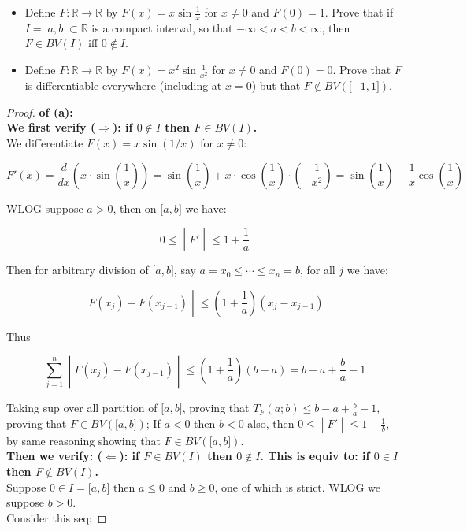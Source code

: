 \documentclass{qlnotes-export}
\begin{document}
\begin{itemize}
\item
  Define \(F:{\mathbb{R}}\rightarrow{\mathbb{R}}\) by \(F(x) = x\sin\frac{1}{x}\) for \(x \neq 0\) and \(F(0) = 1\). Prove that if \(I = \lbrack a,b\rbrack \subset {\mathbb{R}}\) is a compact interval, so that \(- \infty < a < b < \infty\), then \(F \in BV(I)\) iff \(0 \notin I\).
\item
  Define \(F:{\mathbb{R}}\rightarrow{\mathbb{R}}\) by \(F(x) = x^{2}\sin\frac{1}{x^{2}}\) for \(x \neq 0\) and \(F(0) = 0\). Prove that \(F\) is differentiable everywhere (including at \(x = 0\)) but that \(F \notin BV(\lbrack - 1,1\rbrack)\).
\end{itemize}

\begin{proof}

\textbf{of (a):}\\
\textbf{We first verify (\(\Longrightarrow\)): if \(0 \notin I\) then \(F \in BV(I)\).}\\
We differentiate \(F(x) = x\sin(1/x)\) for \(x \neq 0\):

\[F'(x) = \frac{d}{dx}\left( {x \cdot \sin\left( \frac{1}{x} \right)} \right) = \sin\left( \frac{1}{x} \right) + x \cdot \cos\left( \frac{1}{x} \right) \cdot \left( {- \frac{1}{x^{2}}} \right) = \sin\left( \frac{1}{x} \right) - \frac{1}{x}\cos\left( \frac{1}{x} \right)\]

WLOG suppose \(a > 0\), then on \(\lbrack a,b\rbrack\) we have:

\[\left. 0 \leq \middle| F' \middle| \leq 1 + \frac{1}{a} \right.\]

Then for arbitrary division of \(\lbrack a,b\rbrack\), say \(a = x_{0} \leq \cdots \leq x_{n} = b\), for all \(j\) we have:

\[\left. |F(x_{j}) - F(x_{j - 1}) \middle| \leq (1 + \frac{1}{a})(x_{j} - x_{j - 1}) \right.\]

Thus

\[\left. \sum\limits_{j = 1}^{n} \middle| F(x_{j}) - F(x_{j - 1}) \middle| \leq (1 + \frac{1}{a})(b - a) = b - a + \frac{b}{a} - 1 \right.\]

Taking sup over all partition of \(\lbrack a,b\rbrack\), proving that \(T_{F}(a;b) \leq b - a + \frac{b}{a} - 1\), proving that \(F \in BV(\lbrack a,b\rbrack)\); If \(a < 0\) then \(b < 0\) also, then \(\left. 0 \leq \middle| F' \middle| \leq 1 - \frac{1}{b} \right.\), by same reasoning showing that \(F \in BV(\lbrack a,b\rbrack)\).\\
\textbf{Then we verify: (\(\Longleftarrow\)): if \(F \in BV(I)\) then \(0 \notin I\). This is equiv to: if \(0 \in I\) then \(F \notin BV(I)\).}\\
Suppose \(0 \in I = \lbrack a,b\rbrack\) then \(a \leq 0\) and \(b \geq 0\), one of which is strict. WLOG we suppose \(b > 0\).\\
Consider this seq:


\end{proof}
\end{document}
